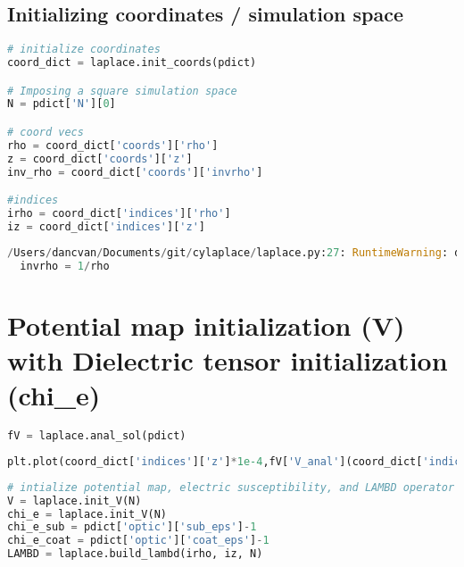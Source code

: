\hypertarget{initializing-coordinates-simulation-space}{%
\subsection{Initializing coordinates / simulation
space}\label{initializing-coordinates-simulation-space}}

\begin{lstlisting}[frame=single, language=Python]
# initialize coordinates
coord_dict = laplace.init_coords(pdict) 

# Imposing a square simulation space
N = pdict['N'][0]

# coord vecs
rho = coord_dict['coords']['rho']
z = coord_dict['coords']['z']
inv_rho = coord_dict['coords']['invrho']

#indices 
irho = coord_dict['indices']['rho']
iz = coord_dict['indices']['z']
\end{lstlisting}

\begin{lstlisting}[frame=single, language=Python]
/Users/dancvan/Documents/git/cylaplace/laplace.py:27: RuntimeWarning: divide by zero encountered in true_divide
  invrho = 1/rho
\end{lstlisting}

\hypertarget{potential-map-initialization-v-with-dielectric-tensor-initialization-chi_e}{%
\section{Potential map initialization (V) with Dielectric tensor
initialization
(chi\_e)}\label{potential-map-initialization-v-with-dielectric-tensor-initialization-chi_e}}

\begin{lstlisting}[frame=single, language=Python]
fV = laplace.anal_sol(pdict)
\end{lstlisting}

\begin{lstlisting}[frame=single, language=Python]
plt.plot(coord_dict['indices']['z']*1e-4,fV['V_anal'](coord_dict['indices']['z']*1e-4))
\end{lstlisting}

\begin{lstlisting}[frame=single, language=Python]
# intialize potential map, electric susceptibility, and LAMBD operator
V = laplace.init_V(N)
chi_e = laplace.init_V(N)
chi_e_sub = pdict['optic']['sub_eps']-1
chi_e_coat = pdict['optic']['coat_eps']-1
LAMBD = laplace.build_lambd(irho, iz, N)
\end{lstlisting}

